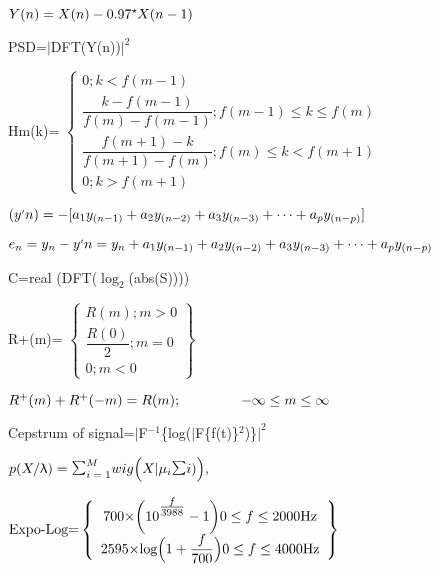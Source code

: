 \documentclass{article}
\begin{document}
$
Y(n)=X(n)-0.97\text{\raisebox{0.9ex}{\mbox{\scriptsize$\star$}}}X(n-1)
$

PSD=$|$DFT(Y(n))$|^2$ 

	Hm(k)=
$	\left\{
	\begin{array}{c}
		0;k < f(m-1) \\
		\dfrac{k-f(m-1)}{f(m)-f(m-1)};f(m-1)\le k\le f(m) \\ 
		\dfrac{f(m+1)-k}{f(m+1)-f(m)};f(m)\le k<f(m+1) \\
		0;k>f(m+1)
	\end{array}
	\right.
$

$
(y\raisebox{0.3ex}{\mbox{\tiny$'$}}n)=-[a_1y_{(n-1)}+a_2y_{(n-2)}+a_3y_{(n-3)}+\cdots+a_py_{(n-p)}]
$

$
e_n=y_n-y\raisebox{0.3ex}{\mbox{\tiny$'$}}n=y_n+a_1y_{(n-1)}+a_2y_{(n-2)}+a_3y_{(n-3)}+\cdots+a_py_{(n-p)}
$

C=real (DFT($\log_2$(abs(S))))

R+(m)=
$	\left\{
	\begin{array}{c} %
		R(m);m>0 \\
		\dfrac{R(0)}{2};m=0 \\
		0;m<0
	\end{array}
	\right\}
$

$
R^+(m)+R^+(-m)=R(m);\hspace{1.5cm} -\infty\le m\le\infty
$

Cepstrum of signal=$|$F$^{-1}$\{log($|$F\{f(t)\}$^2$)\}$|^2$

$
p(X/\uplambda)=\mbox{\Large$\sum_{\mbox{\scriptsize$i=1$}}^{\mbox{\scriptsize$M$}}$}wig\Big(X|\mu_i\mbox{\Large$\sum$}i)\Big),
$

$
\text{Expo-Log=}
\left\{
	\begin{array}{c}
		700\text{\texttimes}\bigg(10^{\raisebox{0.8ex}{\mbox{\normalsize$\frac{f}{3988}$}}}-1\bigg)0\le f\le2000\text{Hz} \\
		2595\text{\texttimes}\text{log}\Big(1+\dfrac{f}{700}\Big)0\le f\le4000\text{Hz} 
	\end{array}
\right\}
$
\end{document}
